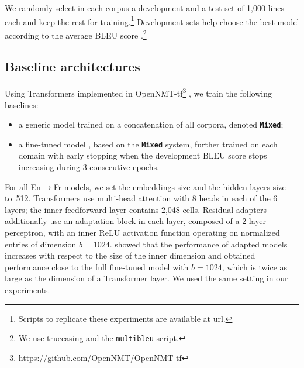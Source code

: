 \documentclass[11pt,a4paper]{article}
\newcommand{\fyTodo}[1]{\Todo[FY:]{\textcolor{orange}{#1}}}
\newcommand{\fyDone}[1]{\done[FY]\Todo[FY:]{\textcolor{orange}{#1}}}
\newcommand{\fyFuture}[1]{\done[FY]\Todo[FY:]{\textcolor{red}{#1}}}
\newcommand{\system}[1]{\texttt{\textbf{#1}}}
\begin{document}
We randomly select in each corpus a development and a test set of 1,000 lines each and keep the rest for training.\footnote{Scripts to replicate these experiments are available at url{}.}\fyTodo{github} Development sets help choose the best model according to the average BLEU score \cite{Papineni02bleu}.\footnote{We use truecasing and the \texttt{multibleu} script.}\fyDone{A word about meta-parameter settings}\fyDone{Answer question of reviewer 3 about splits ?}
\fyFuture{Is this part on significance testing still accurate ?}

\subsection{Baseline architectures \label{ssec:baseline}}
\fyDone{Write this - settings and parameters for Mixed and Full-FT}
Using Transformers \cite{Vaswani17attention} implemented in OpenNMT-tf\footnote{\url{https://github.com/OpenNMT/OpenNMT-tf}} \cite{Klein17opennmt}, we train the following baselines:
\begin{itemize}
\item a generic model trained on a concatenation of all corpora, denoted \system{Mixed};\fyDone{Or mixed nat ?}
\item a fine-tuned model \cite{Luong15stanford,Freitag16fast}, based on the \system{Mixed} system, further trained on each domain with early stopping when the development BLEU score stops increasing during 3 consecutive epochs.
\end{itemize}

For all En$\rightarrow$Fr models, we set the embeddings size and the hidden layers size to~512. Transformers use multi-head attention with 8 heads in each of the 6 layers; the inner feedforward layer contains 2,048 cells. Residual adapters additionally use an adaptation block in each layer, composed of a 2-layer perceptron, with an inner ReLU activation function operating on normalized entries of dimension $b=1024$. \citet{Bapna19simple} showed that the performance of adapted models increases with respect to the size of the inner dimension and obtained performance close to the full fine-tuned model with $b=1024$, which is twice as large as the dimension of a Transformer layer. We used the same setting in our experiments.\fyDone{Check: is it $b$?}
\end{document}
